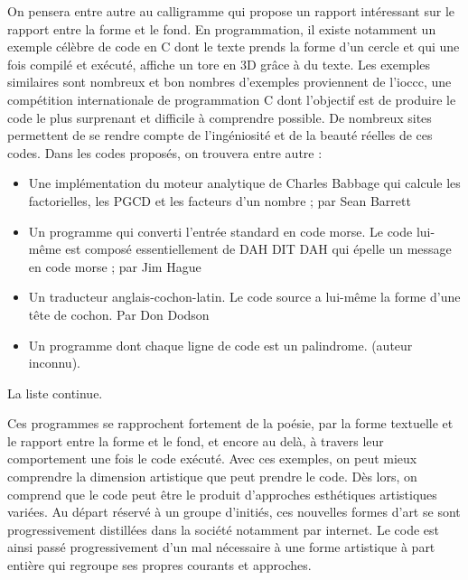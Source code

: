 \documentclass[12pt]{article} %
\begin{document}
On pensera entre autre au \gls{calligramme} qui propose un rapport intéressant sur le rapport entre la forme et le fond. En programmation, il existe notamment un exemple célèbre de code en C dont le texte prends la forme d'un cercle et qui une fois compilé et exécuté, affiche un tore en 3D grâce à du texte. Les exemples similaires sont nombreux et bon nombres d'exemples proviennent de l'\acrshort{ioccc}, une compétition internationale de programmation C dont l'objectif est de produire le code le plus surprenant et difficile à comprendre possible. De nombreux sites permettent de se rendre compte de l'ingéniosité et de la beauté réelles de ces codes. Dans les codes proposés, on trouvera entre autre :
\begin{itemize}
    \item Une implémentation du moteur analytique de Charles Babbage qui calcule les factorielles, les PGCD et les facteurs d'un nombre ; par Sean Barrett \cite{SBarrett-Babble}
    \item Un programme qui converti l'entrée standard en code morse. Le code lui-même est composé essentiellement de DAH DIT DAH qui épelle un message en code morse ; par Jim Hague \cite{JHague-morse}
    \item Un traducteur anglais-cochon-latin. Le code source a lui-même la forme d'une tête de cochon. Par Don Dodson \cite{DDodson-piglatin}
    \item Un programme dont chaque ligne de code est un \gls{palindrome}. (auteur inconnu). 
\end{itemize}
La liste continue. 

Ces programmes se rapprochent fortement de la poésie, par la forme textuelle et le rapport entre la forme et le fond, et encore au delà, à travers leur comportement une fois le code exécuté. Avec ces exemples, on peut mieux comprendre la dimension artistique que peut prendre le code. Dès lors, on comprend que le code peut être le produit d'approches esthétiques artistiques variées. Au départ réservé à un groupe d'initiés, ces nouvelles formes d'art se sont progressivement distillées dans la société notamment par internet. Le code est ainsi passé progressivement d'un mal nécessaire à une forme artistique à part entière qui regroupe ses propres courants et approches.
\end{document}
